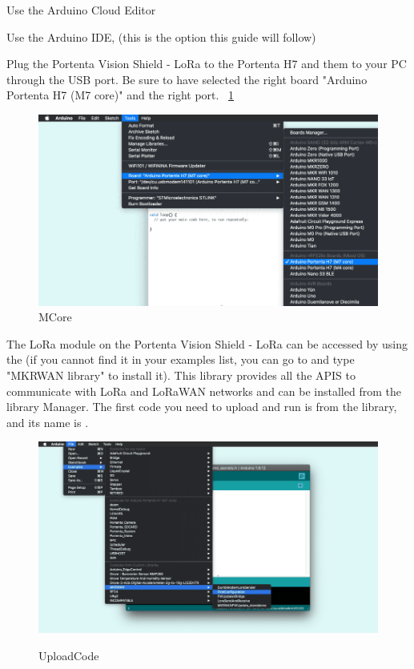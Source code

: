 \begin{itemize}
	Use the Arduino Cloud Editor
	
	Use the Arduino IDE, (this is the option this guide will follow)
	
	Plug the Portenta Vision Shield - LoRa to the Portenta H7 and them to your PC through the USB port. Be sure to have selected the right board "Arduino Portenta H7 (M7 core)" and the right port. ~\ref{MCore} \cite{connecting_to_ttn_portenta_vision_shield:2024}
	
	\begin{figure}
		\begin{center}
			\includegraphics[width=0.7\linewidth]{Images/LORA/MCore.png}
			\caption{MCore}
			\label{MCore}
		\end{center}
	\end{figure}
	
	The LoRa module on the Portenta Vision Shield - LoRa can be accessed by using the (if you cannot find it in your examples list, you can go to  and type "MKRWAN library" to install it). This library provides all the APIS to communicate with LoRa and LoRaWAN networks and can be installed from the library Manager. The first code you need to upload and run is from the  library, and its name is . 
	
	\begin{figure}
		\begin{center}
			\includegraphics[width=0.7\linewidth]{Images/LORA/UploadCode.png}
			\caption{UploadCode}
			\label{UploadCode} \cite{connecting_to_ttn_portenta_vision_shield:2024}
		\end{center}
	\end{figure}
	

\end{itemize}
